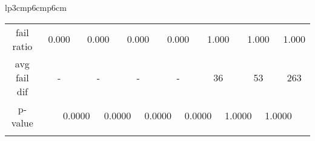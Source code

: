 {\begin{tabular}{lp{3cm}p{6cm}p{6cm}}
\begin{tabular}[h]{m{2.5cm}m{}m{}m{}m{}m{}m{}m{}m{}m{}m{}m{}m{}m{}m{}}
\hline
\multicolumn{1}{c}{fail ratio}&\multicolumn{2}{c}{          0.000}&\multicolumn{2}{c}{    0.000}&\multicolumn{2}{c}{    0.000}&\multicolumn{2}{c}{    0.000}&\multicolumn{2}{c}{    1.000}&\multicolumn{2}{c}{    1.000}&\multicolumn{2}{c}{    1.000}\\
\multicolumn{1}{c}{avg fail dif}&\multicolumn{2}{c}{            -}&\multicolumn{2}{c}{        -}&\multicolumn{2}{c}{        -}&\multicolumn{2}{c}{        -}&\multicolumn{2}{c}{       36}&\multicolumn{2}{c}{       53}&\multicolumn{2}{c}{      263}\\
\hline
\multicolumn{1}{c}{p-value}&&\multicolumn{2}{c}{0.0000}&\multicolumn{2}{c}{0.0000}&\multicolumn{2}{c}{0.0000}&\multicolumn{2}{c}{0.0000}&\multicolumn{2}{c}{1.0000}&\multicolumn{2}{c}{1.0000}\\
&&&&&&&&&&&&&&\end{tabular}
\end{tabular}
}
